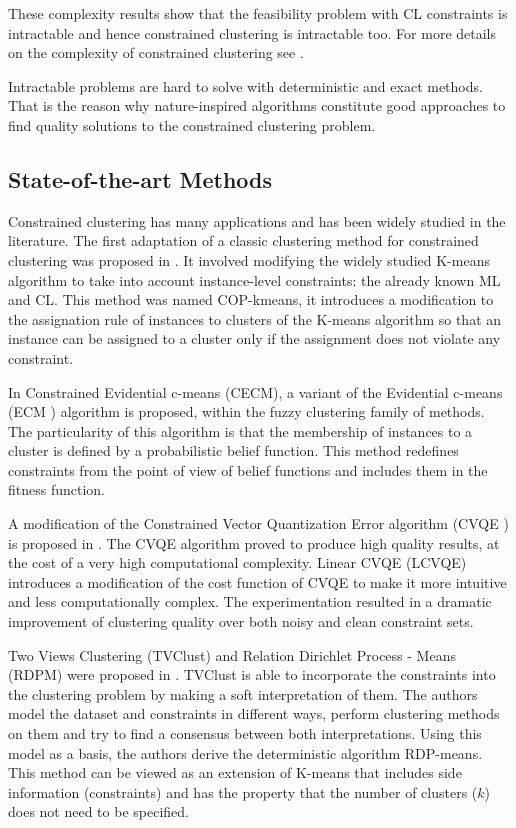 \documentclass[review]{elsarticle}
\begin{document}
These complexity results show that the feasibility problem with CL constraints is intractable and hence constrained clustering is intractable too. For more details on the complexity of constrained clustering see \cite{davidson2005clustering}.

Intractable problems are hard to solve with deterministic and exact methods. That is the reason why nature-inspired algorithms constitute good approaches to find quality solutions to the constrained clustering problem.

\subsection{State-of-the-art Methods} \label{sec:BackSOTA}

Constrained clustering has many applications and has been widely studied in the literature. The first adaptation of a classic clustering method for constrained clustering was proposed in \cite{wagstaff2001constrained}. It involved modifying the widely studied K-means algorithm to take into account instance-level constraints: the already known ML and CL. This method was named COP-kmeans, it introduces a modification to the assignation rule of instances to clusters of the K-means algorithm so that an instance can be assigned to a cluster only if the assignment does not violate any constraint.

In \cite{antoine2012cecm} Constrained Evidential c-means (CECM), a variant of the Evidential c-means (ECM \cite{masson2008ecm}) algorithm is proposed, within the fuzzy clustering family of methods. The particularity of this algorithm is that the membership of instances to a cluster is defined by a probabilistic belief function. This method redefines constraints from the point of view of belief functions and includes them in the fitness function.

A modification of the Constrained Vector Quantization Error algorithm (CVQE \cite{davidson2005clustering}) is proposed in \cite{pelleg2007k}. The CVQE algorithm proved to produce high quality results, at the cost of a very high computational complexity. Linear CVQE (LCVQE) introduces a modification of the cost function of CVQE to make it more intuitive and less computationally complex. The experimentation resulted in a dramatic improvement of clustering quality over both noisy and clean constraint sets.

Two Views Clustering (TVClust) and Relation Dirichlet Process - Means (RDPM) were proposed in \cite{khashabi2015clustering}. TVClust is able to incorporate the constraints into the clustering problem by making a soft interpretation of them. The authors model the dataset and constraints in different ways, perform clustering methods on them and try to find a consensus between both interpretations. Using this model as a basis, the authors derive the deterministic algorithm RDP-means. This method can be viewed as an extension of K-means that includes side information (constraints) and has the property that the number of clusters ($k$) does not need to be specified.
\end{document}
